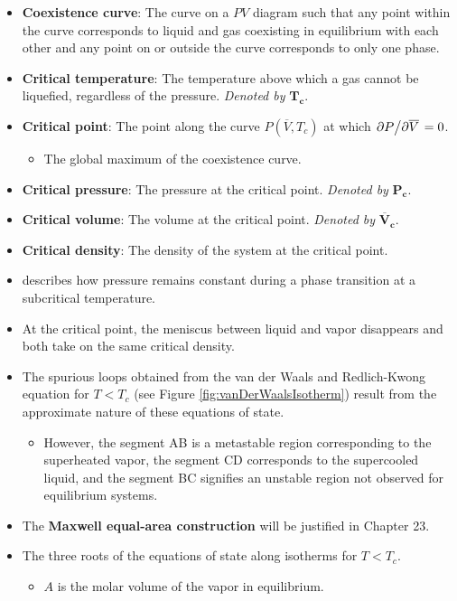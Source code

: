 \documentclass[../notes.tex]{subfiles}
\begin{document}
\begin{itemize}
    \item \textbf{Coexistence curve}: The curve on a $PV$ diagram such that any point within the curve corresponds to liquid and gas coexisting in equilibrium with each other and any point on or outside the curve corresponds to only one phase.
    \item \textbf{Critical temperature}: The temperature above which a gas cannot be liquefied, regardless of the pressure. \emph{Denoted by} $\bm{T_c}$.
    \item \textbf{Critical point}: The point along the curve $P(\overline{V},T_c)$ at which $\pdv*{P}{\overline{V}}=0$.
    \begin{itemize}
        \item The global maximum of the coexistence curve.
    \end{itemize}
    \item \textbf{Critical pressure}: The pressure at the critical point. \emph{Denoted by} $\bm{P_c}$.
    \item \textbf{Critical volume}: The volume at the critical point. \emph{Denoted by} $\bm{\overline{V}_c}$.
    \item \textbf{Critical density}: The density of the system at the critical point.
    \item \textcite{bib:McQuarrieSimon} describes how pressure remains constant during a phase transition at a subcritical temperature.
    \item At the critical point, the meniscus between liquid and vapor disappears and both take on the same critical density.
    \item The spurious loops obtained from the van der Waals and Redlich-Kwong equation for $T<T_c$ (see Figure \ref{fig:vanDerWaalsIsotherm}) result from the approximate nature of these equations of state.
    \begin{itemize}
        \item However, the segment AB is a metastable region corresponding to the superheated vapor, the segment CD corresponds to the supercooled liquid, and the segment BC signifies an unstable region not observed for equilibrium systems.
    \end{itemize}
    \item The \textbf{Maxwell equal-area construction} will be justified in Chapter 23.
    \item The three roots of the equations of state along isotherms for $T<T_c$.
    \begin{itemize}
        \item $A$ is the molar volume of the vapor in equilibrium.

\end{itemize}
\end{itemize}
\end{document}
